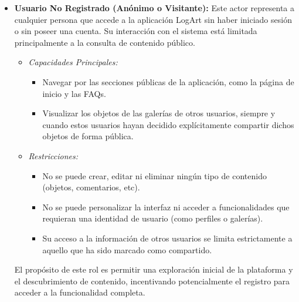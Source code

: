 \begin{itemize}
    \item \textbf{Usuario No Registrado (Anónimo o Visitante):} Este actor representa a cualquier persona que accede a la aplicación LogArt sin haber iniciado sesión o sin poseer una cuenta. Su interacción con el sistema está limitada principalmente a la consulta de contenido público.
    \begin{itemize}
        \item \textit{Capacidades Principales:}
        \begin{itemize}
            \item Navegar por las secciones públicas de la aplicación, como la página de inicio y las FAQs.
            \item Visualizar los objetos de las galerías de otros usuarios, siempre y cuando estos usuarios hayan decidido explícitamente compartir dichos objetos de forma pública.
        \end{itemize}
    \item \textit{Restricciones:}
    \begin{itemize}
        \item No se puede crear, editar ni eliminar ningún tipo de contenido (objetos, comentarios, etc).
        \item No se puede personalizar la interfaz ni acceder a funcionalidades que requieran una identidad de usuario (como perfiles o galerías).
        \item Su acceso a la información de otros usuarios se limita estrictamente a aquello que ha sido marcado como compartido.
    \end{itemize}
    \end{itemize}
    El propósito de este rol es permitir una exploración inicial de la plataforma y el descubrimiento de contenido, incentivando potencialmente el registro para acceder a la funcionalidad completa.

    \vspace{0.5cm}


\end{itemize}
